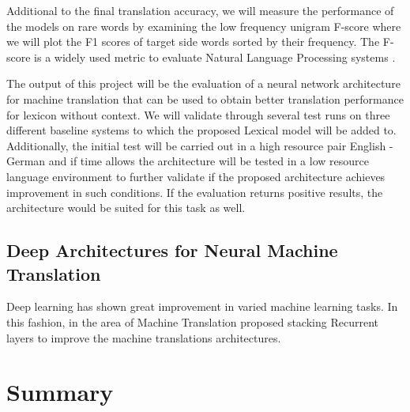 Additional to the final translation accuracy, we will measure the performance of the models on rare words by examining the low frequency unigram F-score where we will plot the F1 scores of target side words sorted by their frequency. The F-score is a widely used metric to evaluate Natural Language Processing systems \citep*{Melamed:2003:PRM:1073483.1073504}.

The output of this project will be the evaluation of a neural network architecture for machine translation that can be used to obtain better translation performance for lexicon without context. We will validate through several test runs on three different baseline systems to which the proposed Lexical model will be added to. Additionally, the initial test will be carried out in a high resource pair English - German and if time allows the architecture will be tested in a low resource language environment to further validate if the proposed architecture achieves improvement in such conditions. If the evaluation returns positive results, the architecture would be suited for this task as well.

\citep*{cettoloEtAl:EAMT2012} 
\subsection{Deep Architectures for Neural Machine Translation}

Deep learning has shown great improvement in varied machine learning tasks. In this fashion, in the area of Machine Translation  \citet*{DBLP:journals/corr/BaroneHSHB17} proposed stacking Recurrent layers to improve the machine translations architectures.

\section{Summary}